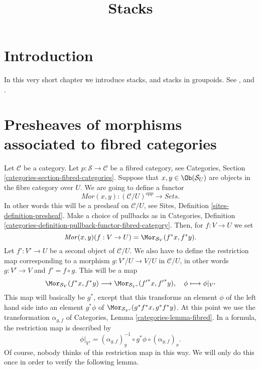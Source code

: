 

%


\title{Stacks}


\maketitle

\label{section-phantom}

\tableofcontents

\section{Introduction}
\label{section-introduction}

\noindent
In this very short chapter we introduce stacks, and
stacks in groupoids. See \cite{DM}, and \cite{Vis2}.


\section{Presheaves of morphisms associated to fibred categories}
\label{section-morphisms}

\noindent
Let $\mathcal{C}$ be a category.
Let $p : \mathcal{S} \to \mathcal{C}$ be a fibred category,
see Categories, Section \ref{categories-section-fibred-categories}.
Suppose that $x, y\in \Ob(\mathcal{S}_U)$ are
objects in the fibre category over $U$. We are going to define
a functor
$$
\mathit{Mor}(x, y) : (\mathcal{C}/U)^{opp} \longrightarrow \textit{Sets}.
$$
In other words this will be a presheaf on $\mathcal{C}/U$, see
Sites, Definition \ref{sites-definition-presheaf}.
Make a choice of pullbacks as in
Categories,
Definition \ref{categories-definition-pullback-functor-fibred-category}.
Then, for $f : V \to U$ we set
$$
\mathit{Mor}(x, y)(f : V \to U) =
\Mor_{\mathcal{S}_V}(f^\ast x, f^\ast y).
$$
Let $f' : V' \to U$ be a second object of $\mathcal{C}/U$.
We also have to define the restriction map corresponding to a
morphism $g : V'/U  \to V/U$ in $\mathcal{C}/U$,
in other words $g : V' \to V$ and $f' = f \circ g$.
This will be a map
$$
\Mor_{\mathcal{S}_V}(f^\ast x, f^\ast y)
\longrightarrow
\Mor_{\mathcal{S}_{V'}}({f'}^\ast x, {f'}^\ast y), \quad
\phi \longmapsto \phi|_{V'}
$$
This map will basically be $g^\ast$, except that this transforms
an element $\phi$ of the left hand side into an element
$g^\ast \phi$
of $\Mor_{\mathcal{S}_{V'}}(g^\ast f^\ast x, g^\ast f^\ast y)$.
At this point we use the transformation $\alpha_{g, f}$ of
Categories, Lemma \ref{categories-lemma-fibred}.
In a formula, the restriction map is described by
$$
\phi|_{V'} =
(\alpha_{g, f})_y^{-1} \circ
g^\ast \phi \circ
(\alpha_{g, f})_x.
$$
Of course, nobody thinks of this restriction map in this way.
We will only do this once in order to verify the following
lemma.

